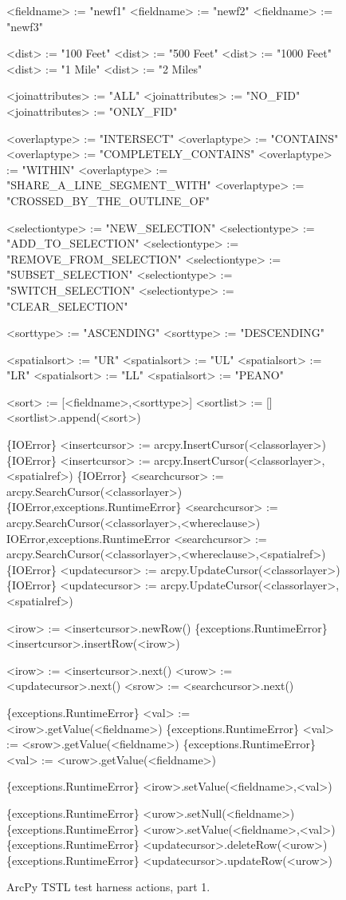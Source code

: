 \begin{figure}
{\begin{code}
<fieldname> := "newf1"
<fieldname> := "newf2"
<fieldname> := "newf3"

<dist> := "100 Feet"
<dist> := "500 Feet"
<dist> := "1000 Feet"
<dist> := "1 Mile"
<dist> := "2 Miles"

<joinattributes> := "ALL"
<joinattributes> := "NO\_FID"
<joinattributes> := "ONLY\_FID"

<overlaptype> := "INTERSECT"
<overlaptype> := "CONTAINS"
<overlaptype> := "COMPLETELY\_CONTAINS"
<overlaptype> := "WITHIN"
<overlaptype> := "SHARE\_A\_LINE\_SEGMENT\_WITH"
<overlaptype> := "CROSSED\_BY\_THE\_OUTLINE\_OF"

<selectiontype> := "NEW\_SELECTION"
<selectiontype> := "ADD\_TO\_SELECTION"
<selectiontype> := "REMOVE\_FROM\_SELECTION"
<selectiontype> := "SUBSET\_SELECTION"
<selectiontype> := "SWITCH\_SELECTION"
<selectiontype> := "CLEAR\_SELECTION"

<sorttype> := "ASCENDING"
<sorttype> := "DESCENDING"

<spatialsort> := "UR"
<spatialsort> := "UL"
<spatialsort> := "LR"
<spatialsort> := "LL"
<spatialsort> := "PEANO"

<sort> := [<fieldname>,<sorttype>]
<sortlist> := []
<sortlist>.append(<sort>)

\{IOError\} <insertcursor> := arcpy.InsertCursor(<classorlayer>)
\{IOError\} <insertcursor> := arcpy.InsertCursor(<classorlayer>,<spatialref>)
\{IOError\} <searchcursor> := arcpy.SearchCursor(<classorlayer>)
\{IOError,exceptions.RuntimeError\} <searchcursor> := arcpy.SearchCursor(<classorlayer>,<whereclause>)
{IOError,exceptions.RuntimeError} <searchcursor> := arcpy.SearchCursor(<classorlayer>,<whereclause>,<spatialref>)
\{IOError\} <updatecursor> := arcpy.UpdateCursor(<classorlayer>)
\{IOError\} <updatecursor> := arcpy.UpdateCursor(<classorlayer>,<spatialref>)

<irow> := <insertcursor>.newRow()
\{exceptions.RuntimeError\} <insertcursor>.insertRow(<irow>)

<irow> := <insertcursor>.next()
<urow> := <updatecursor>.next()
<srow> := <searchcursor>.next()

\{exceptions.RuntimeError\} <val> := <irow>.getValue(<fieldname>)
\{exceptions.RuntimeError\} <val> := <srow>.getValue(<fieldname>)
\{exceptions.RuntimeError\} <val> := <urow>.getValue(<fieldname>)

\{exceptions.RuntimeError\} <irow>.setValue(<fieldname>,<val>)

\{exceptions.RuntimeError\} <urow>.setNull(<fieldname>)
\{exceptions.RuntimeError\} <urow>.setValue(<fieldname>,<val>)
\{exceptions.RuntimeError\} <updatecursor>.deleteRow(<urow>)
\{exceptions.RuntimeError\} <updatecursor>.updateRow(<urow>)

\end{code}
}
\caption{ArcPy TSTL test harness actions, part 1.}
\label{actions1}
\end{figure}

